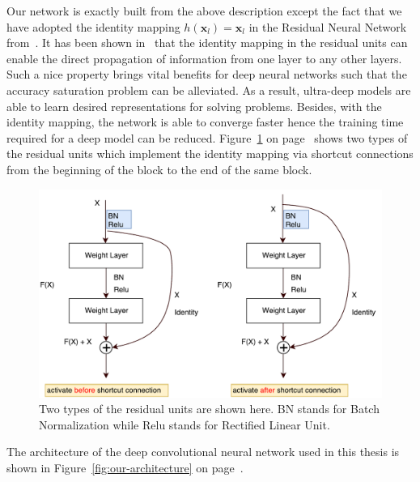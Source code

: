 Our network is exactly built from the above description except the 
fact that we have adopted the identity mapping 
\(h(\mathbf{x}_l)=\mathbf{x}_l\) in the Residual 
Neural Network from~\parencite{RN67}.
It has been shown in~\parencite{RN68} that
the identity mapping in the residual units
can enable the direct propagation of information
from one layer to any other layers.
Such a nice property brings vital benefits
for deep neural networks such that the accuracy
saturation problem can be alleviated.
As a result, ultra-deep models are able to
learn desired representations for solving
problems.
Besides, with the identity mapping, the network
is able to converge faster hence the training time
required for a deep model can be reduced.
Figure~\ref{fig:basic-resnet-structure} on 
page~\pageref{fig:basic-resnet-structure}
shows two types
of the residual units which implement the identity mapping
via shortcut connections from the beginning of the block
to the end of the same block.
\begin{figure}
    \centering
    \includegraphics[width=\textwidth,height=\textheight,keepaspectratio]{Figures/basic-resnet-structure.pdf}
    \caption[Two types of the residual units]{
        Two types of the residual units are shown here.
        BN stands for Batch Normalization while
        Relu stands for Rectified Linear Unit.
        }\label{fig:basic-resnet-structure}
\end{figure}

The architecture of the deep convolutional neural 
network used in this thesis is
shown in Figure~\ref{fig:our-architecture} on 
page~\pageref{fig:our-architecture}.

